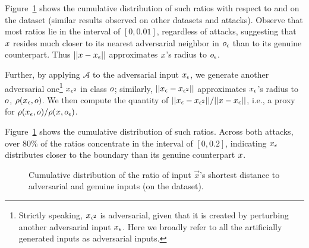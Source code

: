 %

Figure~\ref{fig:sparse}\; shows the cumulative distribution of such ratios with respect to \ttp and \ttca on the \cifar dataset (similar results observed on other datasets and attacks). Observe that most ratios lie in the interval of $[0, 0.01]$, regardless of attacks, suggesting
 that $x$ resides much closer to its nearest adversarial neighbor in $o_\epsilon$ than to its genuine counterpart. Thus $||x - x_{\epsilon}||$ approximates $x$'s radius to $o_\epsilon$.

Further, by applying ${\mathcal A}$ to the adversarial input $x_{\epsilon}$, we generate another adversarial one\footnote{Strictly speaking, $x_{\epsilon^2}$ is adversarial, given that it is created by perturbing another adversarial input $x_{\epsilon}$. Here we broadly refer to all the artificially generated inputs as adversarial inputs.} $x_{\epsilon^2}$ in class $o$; similarly, $||x_{\epsilon} - x_{\epsilon^2}||$ approximates $x_{\epsilon}$'s radius to $o$, $\rho(x_{\epsilon}, o)$. We then compute the quantity of $||x_{\epsilon} - x_{\epsilon^2}||/||x - x_{\epsilon}||$, i.e., a proxy for $\rho(x_{\epsilon}, o)/\rho(x, o_\epsilon)$.

Figure~\ref{fig:sparse}\; shows the cumulative distribution of such ratios. Across both attacks, over 80\% of the ratios concentrate in the interval of $[0, 0.2]$, indicating $x_{\epsilon}$ distributes closer to the boundary than its genuine counterpart $x$.


\begin{figure}
\caption{Cumulative distribution of the ratio of input $\vec{x}$'s shortest distance to adversarial and genuine inputs (on the \svhn dataset). \label{fig:sparse}}
\end{figure}





